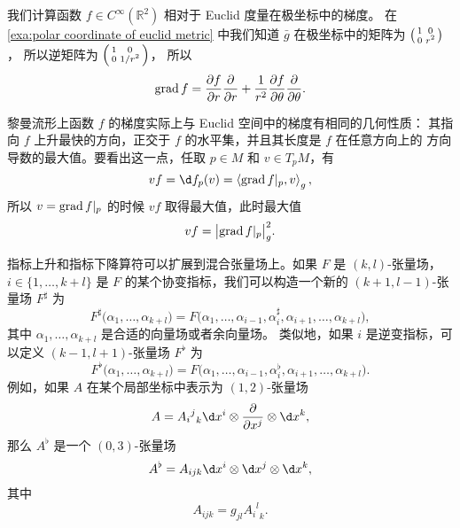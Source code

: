 \begin{example}
  我们计算函数 $f\in C^\infty(\mathbb{R}^2)$ 相对于 Euclid 度量在极坐标中的梯度。
  在 \autoref{exa:polar coordinate of euclid metric} 中我们知道 $\bar g$
  在极坐标中的矩阵为 $\begin{psmallmatrix}1 & 0 \\ 0 & r^2\end{psmallmatrix}$，
  所以逆矩阵为 $\begin{psmallmatrix}1 & 0 \\ 0 & 1/r^2\end{psmallmatrix}$，
  所以 
  \[
    \operatorname{grad} f=\frac{\partial f}{\partial r}\frac{\partial}{\partial r}+
    \frac{1}{r^2}\frac{\partial f}{\partial\theta}  \frac{\partial}{\partial \theta}.
  \]
\end{example}

黎曼流形上函数 $f$ 的梯度实际上与 Euclid 空间中的梯度有相同的几何性质：
其指向 $f$ 上升最快的方向，正交于 $f$ 的水平集，并且其长度是 $f$ 在任意方向上的
方向导数的最大值。要看出这一点，任取 $p\in M$ 和 $v\in T_pM$，有
\[
  vf=\d f_p(v)=  \inn{\grad f|_p,v}_g,
\]
所以 $v=\operatorname{grad} f|_p$ 的时候 $vf$ 取得最大值，此时最大值
\[
  vf=\bigl|\operatorname{grad} f|_p\bigr|_g^2.
\]

指标上升和指标下降算符可以扩展到混合张量场上。如果 $F$ 是 $(k,l)$-张量场，
$i\in\{1,\dots,k+l\}$ 是 $F$ 的某个协变指标，我们可以构造一个新的 $(k+1,l-1)$-张量场
$F^\sharp$ 为
\[
  F^\sharp\bigl(\alpha_1,\dots,\alpha_{k+l}\bigr)=
  F\bigl(\alpha_1,\dots,\alpha_{i-1},\alpha_i^\sharp,\alpha_{i+1},\dots,\alpha_{k+l}\bigr),
\]
其中 $\alpha_1,\dots,\alpha_{k+l}$ 是合适的向量场或者余向量场。
类似地，如果 $i$ 是逆变指标，可以定义 $(k-1,l+1)$-张量场 $F^\flat$
为
\[
  F^\flat\bigl(\alpha_1,\dots,\alpha_{k+l}\bigr)=
  F\bigl(\alpha_1,\dots,\alpha_{i-1},\alpha_i^\flat,\alpha_{i+1},\dots,\alpha_{k+l}\bigr).
\]
例如，如果 $A$ 在某个局部坐标中表示为 $(1,2)$-张量场
\[
  A={{A_{i}}^j}_k\d x^i\otimes \frac{\partial}{\partial x^j}\otimes \d x^k,
\]
那么 $A^\flat$ 是一个 $(0,3)$-张量场
\[
  A^\flat =A_{ijk}\d x^i\otimes \d x^j\otimes \d x^k,  
\]
其中
\[
  A_{ijk}= g_{jl}  {{A_{i}}^l}_k.
\]

